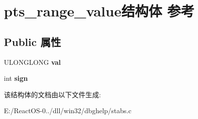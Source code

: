 \hypertarget{structpts__range__value}{}\section{pts\+\_\+range\+\_\+value结构体 参考}
\label{structpts__range__value}
\subsection*{Public 属性}
\begin{DoxyCompactItemize}
\item 
\mbox{\label{structpts__range__value_a946169f621a4a96cdf5a2dd615c10e65}} 
U\+L\+O\+N\+G\+L\+O\+NG {\bfseries val}
\item 
\mbox{\label{structpts__range__value_a4cdae9b9ea5169d468a33c06569c14a6}} 
int {\bfseries sign}
\end{DoxyCompactItemize}


该结构体的文档由以下文件生成\+:\begin{DoxyCompactItemize}
\item 
E\+:/\+React\+O\+S-\/0../dll/win32/dbghelp/stabs.\+c\end{DoxyCompactItemize}
